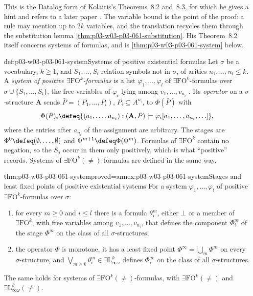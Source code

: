 This is the Datalog form of Kolaitis's Theorems~8.2 and~8.3, for which he
gives a hint and refers to a later paper
\cite[pp.~70--71]{Kolaitis2003ExpressivePowerNotes}. The variable bound is
the point of the proof: a rule may mention up to \(2k\) variables, and the
translation recycles them through the substitution lemma
\cref{thm:p03-w03-p03-061-substitution}. His Theorem~8.2 itself concerns
systems of formulas, and is \cref{thm:p03-w03-p03-061-system} below.

\begin{hbdefinition}{def:p03-w03-p03-061-system}{Systems of positive existential formulas}
Let \(\sigma\) be a vocabulary, \(k\ge1\), and \(S_1,\ldots,S_l\) relation
symbols not in \(\sigma\), of arities \(n_1,\ldots,n_l\le k\). A
\emph{system of positive \(\exists\mathrm{FO}^k\)-formulas} is a list
\(\varphi_1,\ldots,\varphi_l\) of \(\exists\mathrm{FO}^k\)-formulas over
\(\sigma\cup\{S_1,\ldots,S_l\}\), the free variables of \(\varphi_i\) lying
among \(v_1,\ldots,v_{n_i}\) \cite[Thm~8.2, p.~70]{Kolaitis2003ExpressivePowerNotes}.
Its \emph{operator} on a \(\sigma\)-structure \(\mathbf A\) sends
\(\bar P=(P_1,\ldots,P_l)\), \(P_i\subseteq A^{n_i}\), to
\(\Phi(\bar P)\) with
\[
 \Phi(\bar P)_i\defeq\{(a_1,\ldots,a_{n_i}):(\mathbf A,\bar P)\models
 \varphi_i[a_1,\ldots,a_{n_i},\ldots]\},
\]
where the entries after \(a_{n_i}\) of the assignment are arbitrary. The
stages are \(\Phi^0\defeq(\emptyset,\ldots,\emptyset)\) and
\(\Phi^{m+1}\defeq\Phi(\Phi^m)\). Formulas of
\(\exists\mathrm{FO}^k\) contain no negation, so the \(S_j\) occur in them
only positively, which is what ``positive'' records. Systems of
\(\exists\mathrm{FO}^k(\neq)\)-formulas are defined in the same way.
\end{hbdefinition}

\begin{hbtheorem}{thm:p03-w03-p03-061-system}{proved=annex:p03-w03-p03-061-system}{Stages and least fixed points of positive existential systems}
For a system \(\varphi_1,\ldots,\varphi_l\) of positive
\(\exists\mathrm{FO}^k\)-formulas over \(\sigma\):
\begin{enumerate}
\item for every \(m\ge0\) and \(i\le l\) there is a formula
      \(\theta^m_i\), either \(\bot\) or a member of \(\exists\mathrm{FO}^k\),
      with free variables among \(v_1,\ldots,v_{n_i}\), that defines the
      component \(\Phi^m_i\) of the stage \(\Phi^m\) on the class of all
      \(\sigma\)-structures;
\item the operator \(\Phi\) is monotone, it has a least fixed point
      \(\Phi^\infty=\bigcup_m\Phi^m\) on every \(\sigma\)-structure, and
      \(\bigvee_{m\ge0}\theta^m_i\in\exists\mathrm L^k_{\infty\omega}\)
      defines \(\Phi^\infty_i\) on the class of all \(\sigma\)-structures.
\end{enumerate}
The same holds for systems of \(\exists\mathrm{FO}^k(\neq)\)-formulas, with
\(\exists\mathrm{FO}^k(\neq)\) and \(\exists\mathrm L^k_{\infty\omega}(\neq)\).
\end{hbtheorem}

